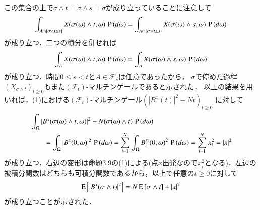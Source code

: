 \begin{prf}
\begin{description}
		この集合の上で$\sigma \wedge t = \sigma \wedge s = \sigma$が成り立っていることに注意して
		\begin{align}
			\int_{A \cap \{ \sigma \wedge t \leq s \}} X(\sigma(\omega) \wedge t, \omega)\, \operatorname{P} \left(d\omega\right)
			= \int_{A \cap \{ \sigma \wedge t \leq s \}} X(\sigma(\omega) \wedge s, \omega)\, \operatorname{P} \left(d\omega\right)
		\end{align}
		が成り立つ．二つの積分を併せれば
		\begin{align}
			\int_{A} X(\sigma(\omega) \wedge t, \omega)\, \operatorname{P} \left(d\omega\right)
			= \int_{A} X(\sigma(\omega) \wedge s, \omega)\, \operatorname{P} \left(d\omega\right)
		\end{align}
		が成り立つ．時間$0 \leq s < t$と$A \in \mathcal{F}_s$は任意であったから，
		$\sigma$で停めた過程$(X_{\sigma \wedge t})_{t \geq 0}$もまた$(\mathcal{F}_t)$-マルチンゲールであると示された．
		以上の結果を用いれば，(1)における$(\mathcal{F}_t)$-マルチンゲール$\left(|B^x(t)|^2 - Nt\right)_{t \geq 0}$
		に対して
		\begin{align}
			&\int_{\Omega} |B^x(\sigma(\omega) \wedge t,\omega)|^2 - N(\sigma(\omega) \wedge t)\, \operatorname{P} \left(d\omega\right) \\
			&\qquad= \int_{\Omega} |B^x(0,\omega)|^2\, \operatorname{P} \left(d\omega\right)
			= \sum_{i=1}^{N} \int_{\Omega} B_i^{x_i}(0,\omega)^2\, \operatorname{P} \left(d\omega\right)
			= \sum_{i=1}^{N} x_i^2
			= |x|^2
		\end{align}
		が成り立つ．右辺の変形は命題3.9の(1)による(点$x$出発なので$x_i^2$となる)．左辺の被積分関数はどちらも可積分関数であるから，以上で任意の$t \geq 0$に対して
		\begin{align}
			\operatorname{E} \left[ |B^x(\sigma \wedge t)|^2 \right] = N\operatorname{E} \left[ \sigma \wedge t \right] + |x|^2
		\end{align}
		が成り立つことが示された．
		

\end{description}
\end{prf}
